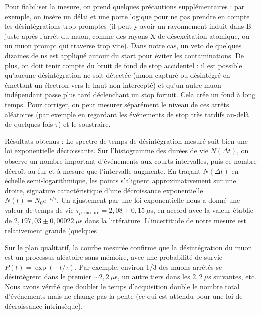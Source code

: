 \documentclass[a4paper,12pt,twoside]{article}
\begin{document}
Pour fiabiliser la mesure, on prend quelques précautions supplémentaires : par exemple, on insère un délai et une porte logique pour ne pas prendre en compte les désintégrations trop promptes (il peut y avoir un rayonnement induit dans B juste après l’arrêt du muon, comme des rayons X de désexcitation atomique, ou un muon prompt qui traverse trop vite).
Dans notre cas, un veto de quelques dizaines de ns est appliqué autour du start pour éviter les contaminations. De plus, on doit tenir compte du bruit de fond de stop accidentel : il est possible qu’aucune désintégration ne soit détectée (muon capturé ou désintégré en émettant un électron vers le haut non intercepté) et qu’un autre muon indépendant passe plus tard déclenchant un stop fortuit. Cela crée un fond à long temps. Pour corriger, on peut mesurer séparément le niveau de ces arrêts aléatoires (par exemple en regardant les événements de stop très tardifs au-delà de quelques fois $\tau$) et le soustraire.

Résultats obtenus : Le spectre de temps de désintégration mesuré suit bien une loi exponentielle décroissante. Sur l’histogramme des durées de vie $N(\Delta t)$, on observe un nombre important d’événements aux courts intervalles, puis ce nombre décroît au fur et à mesure que l’intervalle augmente. En traçant $N(\Delta t)$ en échelle semi-logarithmique, les points s’alignent approximativement sur une droite, signature caractéristique d’une décroissance exponentielle $N(t) = N_0 e^{-t/\tau}$. Un ajustement par une loi exponentielle nous a donné une valeur de temps de vie $\tau_{\mu,\text{mesuré}} = 2,08 \pm 0,15~\mu$s, en accord avec la valeur établie de $2,197,03 \pm 0,00022~\mu$s dans la littérature. L’incertitude de notre mesure est relativement grande (quelques %

Sur le plan qualitatif, la courbe mesurée confirme que la désintégration du muon est un processus aléatoire sans mémoire, avec une probabilité de survie $P(t) = \exp(-t/\tau)$. Par exemple, environ 1/3 des muons arrêtés se désintègrent dans le premier $\sim 2,2~\mu$s, un autre tiers dans les $2,2~\mu$s suivantes, etc. Nous avons vérifié que doubler le temps d’acquisition double le nombre total d’événements mais ne change pas la pente (ce qui est attendu pour une loi de décroissance intrinsèque).
\end{document}
